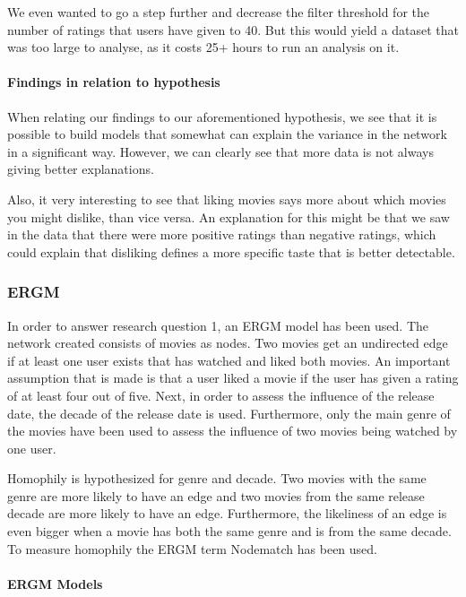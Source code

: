 \documentclass[
  english,
  man,floatsintext]{apa6}
\let\oldparagraph\paragraph
\renewcommand{\paragraph}[1]{\oldparagraph{#1}\mbox{}}
\begin{document}
We even wanted to go a step further and decrease the filter threshold for the number of ratings that users have given to 40. But this would yield a dataset that was too large to analyse, as it costs 25+ hours to run an analysis on it.

\hypertarget{findings-in-relation-to-hypothesis}{%
\paragraph{Findings in relation to hypothesis}\label{findings-in-relation-to-hypothesis}}

When relating our findings to our aforementioned hypothesis, we see that it is possible to build models that somewhat can explain the variance in the network in a significant way. However, we can clearly see that more data is not always giving better explanations.

Also, it very interesting to see that liking movies says more about which movies you might dislike, than vice versa. An explanation for this might be that we saw in the data that there were more positive ratings than negative ratings, which could explain that disliking defines a more specific taste that is better detectable.

\hypertarget{ergm-1}{%
\subsubsection{ERGM}\label{ergm-1}}

In order to answer research question 1, an ERGM model has been used. The network created consists of movies as nodes. Two movies get an undirected edge if at least one user exists that has watched and liked both movies. An important assumption that is made is that a user liked a movie if the user has given a rating of at least four out of five. Next, in order to assess the influence of the release date, the decade of the release date is used. Furthermore, only the main genre of the movies have been used to assess the influence of two movies being watched by one user.

Homophily is hypothesized for genre and decade. Two movies with the same genre are more likely to have an edge and two movies from the same release decade are more likely to have an edge. Furthermore, the likeliness of an edge is even bigger when a movie has both the same genre and is from the same decade. To measure homophily the ERGM term Nodematch has been used.

\hypertarget{ergm-models}{%
\paragraph{ERGM Models}\label{ergm-models}}
\end{document}
